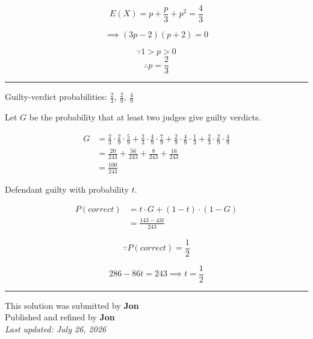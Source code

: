 \documentclass[12pt]{article}
\begin{document}
\newcommand{\ds}{\displaystyle}

$$E(X)=p+\frac p3+p^2=\frac43$$

$$\implies (3p-2)(p+2)=0$$

$$\because 1>p>0$$
$$\therefore p=\frac23$$

\bigskip\hrule\bigskip

Guilty-verdict probabilities: $\ds \frac23,\  \frac29,\  \frac49$

Let $G$ be the probability that at least two judges give guilty verdicts.

\begin{align*}
G
&=\frac23\cdot\frac29\cdot\frac59
+\frac23\cdot\frac49\cdot\frac79
+\frac29\cdot\frac49\cdot\frac13
+\frac23\cdot\frac29\cdot\frac49\\
&=\frac{20}{243}+\frac{56}{243}+\frac{8}{243}+\frac{16}{243}\\
&=\frac{100}{243}
\end{align*}

Defendant guilty with probability $t$.

\begin{align*}
P(correct)
&=t\cdot G+(1-t)\cdot(1-G)\\
&=\frac{143-43t}{243}
\end{align*}

$$\because P(correct)=\frac12$$

$$286-86t=243\implies t=\frac12$$

\bigskip
\hrule
\begin{center}
    This solution was submitted by \textbf{Jon}\\[4pt]
    Published and refined by \textbf{Jon}\\[8pt]
    \textit{Last updated: July 26, 2026}
\end{center}
\end{document}
